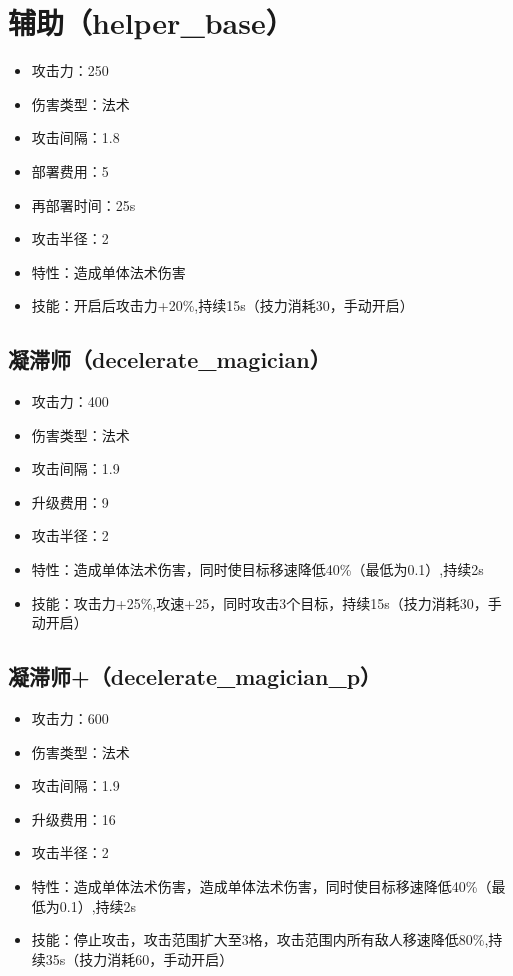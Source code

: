 	\section{辅助（helper\_base）}
		\begin{itemize}
			\item 攻击力：250
			\item 伤害类型：法术
			\item 攻击间隔：1.8
			\item 部署费用：5
			\item 再部署时间：25s
			\item 攻击半径：2
			\item 特性：造成单体法术伤害
			\item 技能：开启后攻击力+20\%,持续15s（技力消耗30，手动开启）
		\end{itemize}
		\subsection{凝滞师（decelerate\_magician）}
			\begin{itemize}
				\item 攻击力：400
				\item 伤害类型：法术
				\item 攻击间隔：1.9
				\item 升级费用：9
				\item 攻击半径：2
				\item 特性：造成单体法术伤害，同时使目标移速降低40\%（最低为0.1）,持续2s
				\item 技能：攻击力+25\%,攻速+25，同时攻击3个目标，持续15s（技力消耗30，手动开启）
			\end{itemize}
		\subsection{凝滞师+（decelerate\_magician\_p）}
			\begin{itemize}
				\item 攻击力：600
				\item 伤害类型：法术
				\item 攻击间隔：1.9
				\item 升级费用：16
				\item 攻击半径：2
				\item 特性：造成单体法术伤害，造成单体法术伤害，同时使目标移速降低40\%（最低为0.1）,持续2s
				\item 技能：停止攻击，攻击范围扩大至3格，攻击范围内所有敌人移速降低80\%,持续35s（技力消耗60，手动开启）
			\end{itemize}

